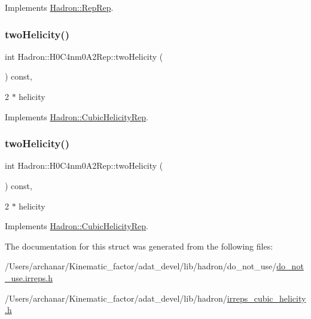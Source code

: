 Implements \mbox{\hyperlink{structHadron_1_1RepRep_ab3213025f6de249f7095892109575fde}{Hadron\+::\+Rep\+Rep}}.

\mbox{\label{structHadron_1_1H0C4nm0A2Rep_a9c95fc4b1759a69a69dd2406a3e0a36b}} 
\subsubsection{\texorpdfstring{twoHelicity()}{twoHelicity()}\hspace{0.1cm}{\footnotesize\ttfamily [1/2]}}
{\footnotesize\ttfamily int Hadron\+::\+H0\+C4nm0\+A2\+Rep\+::two\+Helicity (\begin{DoxyParamCaption}{ }\end{DoxyParamCaption}) const\hspace{0.3cm}{\ttfamily [inline]}, {\ttfamily [virtual]}}

2 $\ast$ helicity 

Implements \mbox{\hyperlink{structHadron_1_1CubicHelicityRep_af507aa56fc2747eacc8cb6c96db31ecc}{Hadron\+::\+Cubic\+Helicity\+Rep}}.

\mbox{\label{structHadron_1_1H0C4nm0A2Rep_a9c95fc4b1759a69a69dd2406a3e0a36b}} 
\subsubsection{\texorpdfstring{twoHelicity()}{twoHelicity()}\hspace{0.1cm}{\footnotesize\ttfamily [2/2]}}
{\footnotesize\ttfamily int Hadron\+::\+H0\+C4nm0\+A2\+Rep\+::two\+Helicity (\begin{DoxyParamCaption}{ }\end{DoxyParamCaption}) const\hspace{0.3cm}{\ttfamily [inline]}, {\ttfamily [virtual]}}

2 $\ast$ helicity 

Implements \mbox{\hyperlink{structHadron_1_1CubicHelicityRep_af507aa56fc2747eacc8cb6c96db31ecc}{Hadron\+::\+Cubic\+Helicity\+Rep}}.



The documentation for this struct was generated from the following files\+:\begin{DoxyCompactItemize}
\item 
/\+Users/archanar/\+Kinematic\+\_\+factor/adat\+\_\+devel/lib/hadron/do\+\_\+not\+\_\+use/\mbox{\hyperlink{do__not__use_8irreps_8h}{do\+\_\+not\+\_\+use.\+irreps.\+h}}\item 
/\+Users/archanar/\+Kinematic\+\_\+factor/adat\+\_\+devel/lib/hadron/\mbox{\hyperlink{lib_2hadron_2irreps__cubic__helicity_8h}{irreps\+\_\+cubic\+\_\+helicity.\+h}}\end{DoxyCompactItemize}
